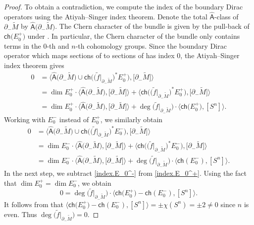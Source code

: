 \begin{proof}
To obtain a contradiction, we compute the index of the boundary Dirac operators using the Atiyah--Singer index theorem.
Denote the total $\hat{\mathsf{A}}$-class of $\partial_- \tilde{M}$ by $\hat{\mathsf{A}}\big(\partial_- \tilde{M}\big)$. The Chern character of the bundle  is given by the pull-back of $\mathsf{ch}\big(E_0^+\big)$ under . In particular, the Chern character of the bundle  only contains terms in the $0$-th and $n$-th cohomology groups. Since the boundary Dirac operator which maps sections of  to sections of  has index $0$, the Atiyah--Singer index theorem gives
\begin{align}
0
&= \big\langle \hat{\mathsf{A}}\big(\partial_- \tilde{M}\big) \cup \mathsf{ch}\big(\big( \tilde{f}|_{\partial_- \tilde{M}}\big)^* E_0^+\big),\big[\partial_- \tilde{M}\big] \big\rangle\nonumber \\
&= \dim E_0^+ \cdot \big\langle \hat{\mathsf{A}}\big(\partial_- \tilde{M}\big),\big[\partial_- \tilde{M}\big] \big\rangle + \big\langle \mathsf{ch}\big(\big( \tilde{f}|_{\partial_- \tilde{M}}\big)^* E_0^+\big), \big[\partial_- \tilde{M}\big] \big\rangle\nonumber \\
&= \dim E_0^+ \cdot \big\langle \hat{\mathsf{A}}\big(\partial_- \tilde{M}\big),\big[\partial_- \tilde{M}\big] \big\rangle + \deg\big(\tilde{f}|_{\partial_- \tilde{M}}\big) \cdot \big\langle \mathsf{ch}\big(E_0^+\big), [S^n] \big\rangle. \label{index.E_0^+}
\end{align}
Working with $E_0^-$ instead of $E_0^+$, we similarly obtain
\begin{align}
0
&= \big\langle \hat{\mathsf{A}}\big(\partial_- \tilde{M}\big) \cup \mathsf{ch}\big(\big( \tilde{f}|_{\partial_- \tilde{M}}\big)^* E_0^-\big),\big[\partial_- \tilde{M}\big] \big\rangle\nonumber \\
&= \dim E_0^- \cdot \big\langle \hat{\mathsf{A}}\big(\partial_- \tilde{M}\big),\big[\partial_- \tilde{M}\big] \big\rangle + \big\langle \mathsf{ch}\big(\big( \tilde{f}|_{\partial_- \tilde{M}}\big)^* E_0^-\big), \big[\partial_- \tilde{M}\big] \big\rangle \nonumber\\
&= \dim E_0^- \cdot \big\langle \hat{\mathsf{A}}\big(\partial_- \tilde{M}\big),\big[\partial_- \tilde{M}\big] \big\rangle + \deg\big(\tilde{f}|_{\partial_- \tilde{M}}\big) \cdot \big\langle \mathsf{ch}(E_0^-), [S^n] \big\rangle.\label{index.E_0^-}
\end{align}
In the next step, we subtract \eqref{index.E_0^-} from \eqref{index.E_0^+}.
Using the fact that $\dim E_0^+ = \dim E_0^-$, we obtain
\[
 0 = \deg\big(\tilde{f}|_{\partial_- \tilde{M}}\big) \cdot \big\langle \mathsf{ch}\big(E_0^+\big) - \mathsf{ch}(E_0^-), [S^n] \big\rangle.
 \]
It follows from \cite[Proposition~11.24, Chapter~III]{Lawson-Michelsohn} that $\big\langle \mathsf{ch}\big(E_0^+\big) - \mathsf{ch}(E_0^-), [S^n] \big\rangle = \pm \chi(S^n) =\pm 2 \neq 0$ since $n$ is even.
Thus $\deg\big(\tilde{f}|_{\partial_- \tilde{M}}\big)=0$.


\end{proof}

